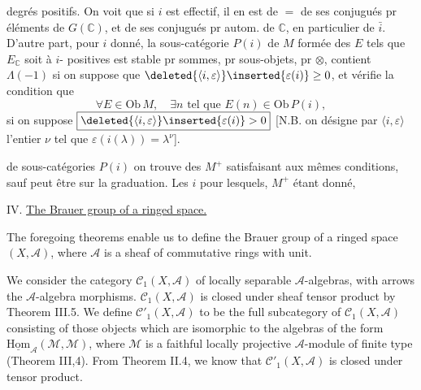 degrés positifs. On voit que si $i$ est effectif, il en est de $=$ de ses conjugués pr éléments de $G(\mathbb{C})$, et de ses conjugués pr autom. de $\mathbb{C}$, en particulier de $\bar i$. D'autre part, pour $i$ donné, la sous-catégorie  $P(i)$ de $M$ formée des $E$ tels que $E_{\mathbb{C}}$ soit à $i$- positives est  stable pr \deleted{$\unsure{\otimes}$} sommes, pr  sous-objets, pr $\otimes$, contient  $\Lambda(-1)$ si on suppose que  $\deleted{\langle i,\varepsilon\rangle}\inserted{\varepsilon(i)}\geq0$, et vérifie la condition que
\[
\forall E\in\mathrm{Ob}\,M,\quad \exists n\text{ tel que }E(n)\in\mathrm{Ob}\,P(i),
\]
si on suppose $\boxed{\deleted{\langle i,\varepsilon\rangle}\inserted{\varepsilon(i)}>0}$ [N.B. on désigne par $\langle i,\varepsilon\rangle$ l'entier $\nu$ tel que $\varepsilon(i(\lambda))=\lambda^\nu$].

 de sous-catégories $P(i)$ on trouve des $M^+$ satisfaisant aux mêmes conditions, sauf peut être  sur la graduation.
Les $i$ pour lesquels, $M^+$ étant donné,



IV. \uline{The Brauer group of a ringed space.}

The foregoing theorems enable us to define the Brauer group of a ringed space $(X,\mathcal{A})$, where $\mathcal{A}$ is a sheaf of commutative rings with unit.

We consider the category $\mathcal{C}_1(X,\mathcal{A})$ of locally separable $\mathcal{A}$-algebras, with arrows the $\mathcal{A}$-algebra morphisms. $\mathcal{C}_1(X,\mathcal{A})$ is closed under sheaf tensor product by Theorem III.5. We define $\mathcal{C}'_1(X,\mathcal{A})$ to be the full subcategory of $\mathcal{C}_1(X,\mathcal{A})$ consisting of those objects which are isomorphic to the algebras of the form $\underline{\mathrm{Hom}}_{\mathcal{A}}(\mathcal{M},\mathcal{M})$, where $\mathcal{M}$ is a faithful locally projective $\mathcal{A}$-module of finite type (Theorem III,4). From Theorem II.4, we know that $\mathcal{C}'_1(X,\mathcal{A})$ is closed under tensor product.

